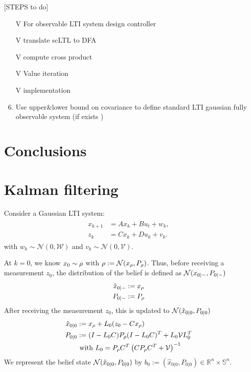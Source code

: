 \documentclass{ifacconf}
\newcommand{\red}[1]{{\color{red} #1}}
\begin{document}
 \noindent{\textbf{}}

    
    \red{[STEPS to do]
  \begin{enumerate}
  	\item[V] For observable LTI system design controller
  	\item[V] translate scLTL to DFA
  	\item[V] compute cross product
  	\item[V] Value iteration
  	\item[V] implementation
  	  	\item Use upper\&lower bound on covariance to define standard LTI gaussian fully observable system (if exists )  
  \end{enumerate}
  
  
  }
    
  
\section{Conclusions}






\appendix

\section{Kalman filtering}
Consider a Gaussian LTI system:
 \begin{align}  \begin{aligned}
x_{k+1}&=A x_{k} + B u_t+ w_k,\\
z_k&=Cx_k+Du_k+v_k.\end{aligned} \end{align}
with $w_k\sim \mathcal N(0, \mathcal W)$ and $v_k\sim \mathcal N (0,\mathcal V)$.

At $k=0$, we know $x_0\sim \rho$ with $\rho:=\mathcal N(x_\rho,P_\rho)$.
Thus,  before receiving a measurement $z_0$, the distribution of the belief is defined as $\mathcal{N}(x_{0|-}, P_{0|-})$
\begin{align}
	\hat x_{0|-}&:= x_\rho\\
	P_{0|-}&:= P_{\rho}
\end{align}
After receiving the measurement $z_0$, this is updated to $\mathcal{N}(\hat x_{0|0}, P_{0|0})$
\begin{align}
	\hat x_{0|0}&:= x_\rho+ L_0 (z_0-Cx_\rho)\\
	P_{0|0}&:=(I-L_0 C) P_{\rho}(I-L_0 C)^T+L_0\mathcal{V} L_0^T\\
	& \mbox{ with } L_0=P_{\rho}C^T\left(CP_{\rho}C^T+\mathcal V\right)^{-1}
\end{align}
We represent the belief state  $\mathcal{N}(\hat x_{0|0}, P_{0|0})$ by $b_0:=(\hat x_{0|0}, P_{0|0})\in\mathbb R^n\times \mathbb S^n$.
\end{document}
